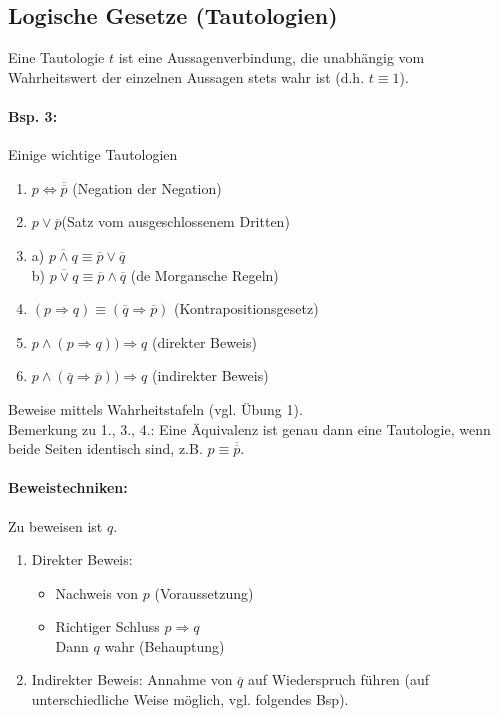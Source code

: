 \subsection{Logische Gesetze (Tautologien)}
Eine Tautologie $t$ ist eine Aussagenverbindung, die unabhängig vom Wahrheitswert der einzelnen Aussagen stets wahr ist (d.h. $t\equiv 1$).
\paragraph{Bsp. 3:}\parskp
Einige wichtige Tautologien
\begin{enumerate}
\item $p\Leftrightarrow \overline{\overline{p}}$ \tab \tab(Negation der Negation)
\item $p \vee \overline{p}$\tab \tab (Satz vom ausgeschlossenem Dritten)
\item a) $\overline{p\wedge q} \equiv \overline{p} \vee \overline{q}$\\
b) $\overline{p\vee q} \equiv \overline{p} \wedge \overline{q}$ \tab(de Morgansche Regeln)
\item $(p\Rightarrow q) \equiv (\overline{q} \Rightarrow \overline{p})$ \tab(Kontrapositionsgesetz)
\item $p\wedge (p\Rightarrow q)) \Rightarrow q$ \tab(direkter Beweis)
\item $p\wedge (\overline{q} \Rightarrow \overline{p})) \Rightarrow q$ \tab(indirekter Beweis)
\end{enumerate}
Beweise mittels Wahrheitstafeln (vgl. Übung 1).\\
Bemerkung zu 1., 3., 4.: Eine Äquivalenz ist genau dann eine Tautologie, wenn beide Seiten identisch sind, z.B. $p\equiv \overline{\overline{p}}$.

\paragraph{Beweistechniken:} \parskp
Zu beweisen ist $q$.
\begin{enumerate}
\item Direkter Beweis:
\begin{itemize}
\item Nachweis von $p$ (Voraussetzung)
\item Richtiger Schluss $p\Rightarrow q$\\
Dann $q$ wahr (Behauptung)
\end{itemize}
\item Indirekter Beweis: Annahme von $\overline{q}$ auf Wiederspruch führen (auf unterschiedliche Weise möglich, vgl. folgendes Bsp).
\end{enumerate}

